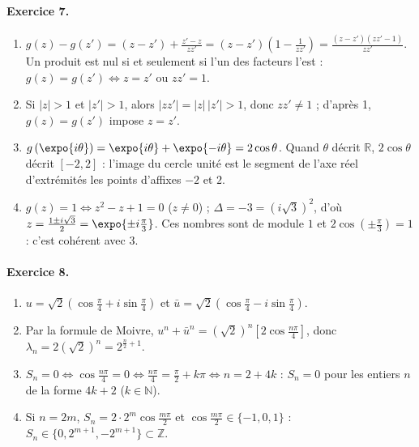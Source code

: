 \begin{corrige}
\paragraph{Exercice 7.}
\begin{enumerate}
\item $g(z) - g(z') = (z - z') + \frac{z' - z}{zz'} = (z - z')\left(1 - \frac{1}{zz'}\right) = \frac{(z - z')(zz' - 1)}{zz'}$.
      Un produit est nul si et seulement si l'un des facteurs l'est : $g(z) = g(z') \iff z = z'$ ou $zz' = 1$.
\item Si $|z| > 1$ et $|z'| > 1$, alors $|zz'| = |z|\,|z'| > 1$, donc $zz' \neq 1$ ; d'apr\`es 1, $g(z) = g(z')$ impose $z = z'$.
\item $g\left(\expo{i\theta}\right) = \expo{i\theta} + \expo{-i\theta} = 2\cos\theta$. Quand $\theta$ d\'ecrit $\mathbb{R}$, $2\cos\theta$ d\'ecrit $[-2,2]$ :
      l'image du cercle unit\'e est le segment de l'axe r\'eel d'extr\'emit\'es les points d'affixes $-2$ et $2$.
\item $g(z) = 1 \iff z^2 - z + 1 = 0$ ($z \neq 0$) ; $\Delta = -3 = (i\sqrt{3})^2$, d'o\`u $z = \frac{1 \pm i\sqrt{3}}{2} = \expo{\pm i\frac{\pi}{3}}$.
      Ces nombres sont de module $1$ et $2\cos\left(\pm\frac{\pi}{3}\right) = 1$ : c'est coh\'erent avec 3.
\end{enumerate}

\paragraph{Exercice 8.}
\begin{enumerate}
\item $u = \sqrt{2}\left(\cos\frac{\pi}{4} + i\sin\frac{\pi}{4}\right)$ et $\bar{u} = \sqrt{2}\left(\cos\frac{\pi}{4} - i\sin\frac{\pi}{4}\right)$.
\item Par la formule de Moivre, $u^n + \bar{u}^n = (\sqrt{2})^n\left[2\cos\frac{n\pi}{4}\right]$, donc $\lambda_n = 2(\sqrt{2})^n = 2^{\frac{n}{2}+1}$.
\item $S_n = 0 \iff \cos\frac{n\pi}{4} = 0 \iff \frac{n\pi}{4} = \frac{\pi}{2} + k\pi \iff n = 2 + 4k$ :
      $S_n = 0$ pour les entiers $n$ de la forme $4k + 2$ ($k \in \mathbb{N}$).
\item Si $n = 2m$, $S_n = 2\cdot 2^m\cos\frac{m\pi}{2}$ et $\cos\frac{m\pi}{2} \in \{-1, 0, 1\}$ : $S_n \in \{0, 2^{m+1}, -2^{m+1}\} \subset \mathbb{Z}$.
\end{enumerate}


\end{corrige}
